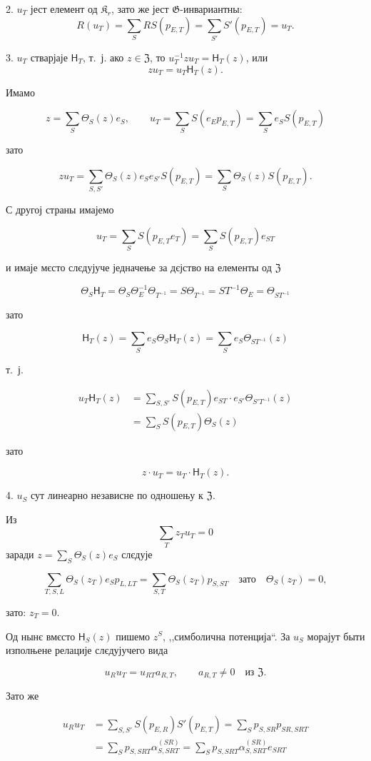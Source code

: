 \documentclass[11pt]{article}
\begin{document}
2. \(u_T\) јест елемент од \(\mathfrak K_r\), зато же јест \(\mathfrak G\)-инвариантны:
\[
R(u_T)=\sum_S RS(p_{E,T})=\sum_{S'} S'(p_{E,T})=u_T.
\]

3. \(u_T\) стварјаје \(\mathsf{H}_T\), т.~ј. ако \(z\in\mathfrak Z\), то \(u_T^{-1}zu_T=\mathsf{H}_T(z)\), или
\[
z u_T=u_T \mathsf{H}_T(z).
\]

Имамо

\[
z=\sum_S\Theta_S(z)e_S,\qquad
u_T=\sum_S S(e_Ep_{E,T})=\sum_S e_S S(p_{E,T})
\]

зато

\[
zu_T=\sum_{S,S'}\Theta_S(z)e_Se_{S'}S(p_{E,T})
=\sum_S\Theta_S(z)S(p_{E,T}).
\]

С другој страны имајемо

\[
u_T=\sum_S S(p_{E,T}e_T)=\sum_S S(p_{E,T})e_{ST}
\]

и имаје мєсто слєдујуче једначење за дєјство на елементы од \(\mathfrak Z\)

\[
\Theta_S \mathsf{H}_T=\Theta_S\Theta_E^{-1}\Theta_{T^{-1}}
=S\Theta_{T^{-1}}=ST^{-1}\Theta_E=\Theta_{ST^{-1}}
\]

зато

\[
\mathsf{H}_T(z)=\sum_S e_S\Theta_S \mathsf{H}_T(z)=\sum_S e_S\Theta_{ST^{-1}}(z)
\]

т.~ј.

\[
\begin{aligned}
u_T\mathsf{H}_T(z)
&=\sum_{S,S'} S(p_{E,T})e_{ST}\cdot e_{S'}\Theta_{S'T^{-1}}(z)\\
&=\sum_S S(p_{E,T})\Theta_S(z)
\end{aligned}
\]

зато

\[
z\cdot u_T=u_T\cdot \mathsf{H}_T(z).
\]

4. \(u_S\) сут линеарно независне по одношењу к \(\mathfrak Z\).

Из
\[
\sum_T z_Tu_T=0
\]
заради \(z=\sum_S\Theta_S(z)e_S\) слєдује

\[
\sum_{T,S,L}\Theta_S(z_T)e_Sp_{L,LT}
=\sum_{S,T}\Theta_S(z_T)p_{S,ST}\quad\text{зато}\quad
\Theta_S(z_T)=0,
\]

зато: \(z_T=0\).

Од нынє вмєсто \(\mathsf{H}_S(z)\) пишемо \(z^S\), ,,симболична потенција``. За \(u_S\) морајут быти изполњене релације слєдујучего вида

\[
u_Ru_T=u_{RT}a_{R,T},\qquad a_{R,T}\ne0\quad\text{из }\mathfrak Z.
\]

Зато же

\[
\begin{aligned}
u_Ru_T
&=\sum_{S,S'} S(p_{E,R})S'(p_{E,T})
=\sum_S p_{S,SR}p_{SR,SRT}\\
&=\sum_S p_{S,SRT}\alpha_{S,SRT}^{(SR)}
=\sum_S p_{S,SRT}\alpha_{S,SRT}^{(SR)}e_{SRT}
\end{aligned}
\]
\end{document}
